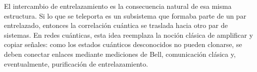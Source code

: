 \documentclass[../main.tex]{subfiles}
\begin{document}
El intercambio de entrelazamiento es la consecuencia natural de esa misma estructura. Si lo que se teleporta es un subsistema que formaba parte de un par entrelazado, entonces la correlación cuántica se traslada hacia otro par de sistemas. En redes cuánticas, esta idea reemplaza la noción clásica de amplificar y copiar señales: como los estados cuánticos desconocidos no pueden clonarse, se deben conectar enlaces mediante mediciones de Bell, comunicación clásica y, eventualmente, purificación de entrelazamiento.

\newpage
\end{document}
